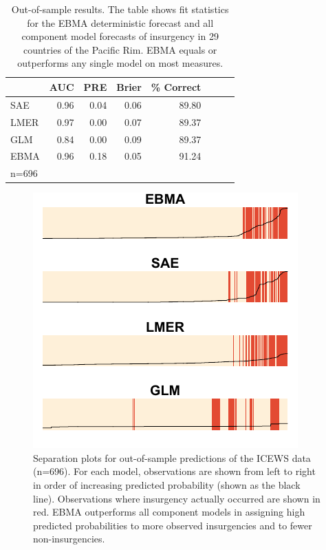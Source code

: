 \documentclass[pdftex,12pt,fullpage,oneside]{amsart}
\begin{document}
\begin{table}
\small
\begin{center}
  \caption{\footnotesize Out-of-sample results. The table shows fit
    statistics for the EBMA deterministic forecast and all component
    model forecasts of insurgency in 29 countries of the Pacific
    Rim. EBMA equals or outperforms any single model on most
    measures.}\label{OutSam1}
\begin{tabular}{l rrrrrrr}
  \toprule
 & AUC & PRE & Brier & \% Correct \\ 
  \midrule
  SAE &  0.96 & 0.04 & 0.06 & 89.80 \\ 
  LMER & 0.97 & 0.00 & 0.07 & 89.37\\ 
  GLM & 0.84 & 0.00 & 0.09 & 89.37\\ 
  EBMA & 0.96 & 0.18 & 0.05 & 91.24 \\ 
   \bottomrule
n=696 \\
\end{tabular}
\end{center}

\end{table}



\begin{figure}
  \caption{\footnotesize Separation plots for out-of-sample
    predictions of the ICEWS data (n=696). For each model,
    observations are shown from left to right in order of increasing
    predicted probability (shown as the black line). Observations
    where insurgency actually occurred are shown in red. EBMA
    outperforms all component models in assigning high predicted
    probabilities to more observed insurgencies and to fewer
    non-insurgencies.}
\label{OutSam1sep}
\begin{center}
\includegraphics[]{OutSampleNew.pdf}
\end{center}
\end{figure}
\end{document}

